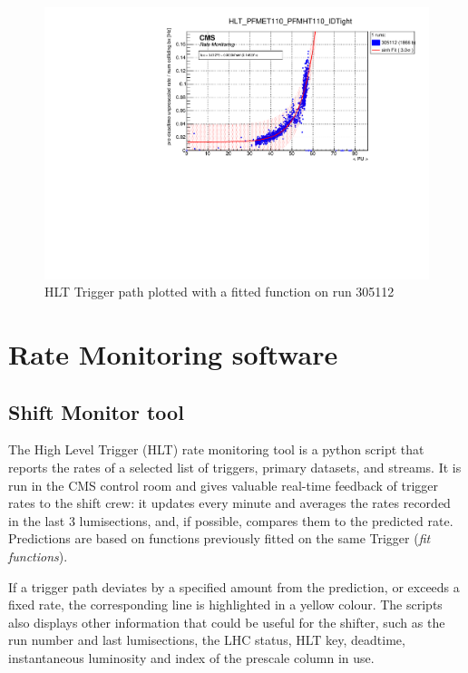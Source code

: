 \begin{figure}
    \centerline{
        \includegraphics[width=0.6\paperwidth]{figures/RMT_305112_HLT_PFMET110_PFMHT110_IDTight.pdf}}
    \caption{HLT Trigger path plotted with a fitted function on run 305112}
    \label{fig:ratemon_hlt}
\end{figure}

\section{Rate Monitoring software}

\subsection{Shift Monitor tool}

The High Level Trigger (HLT) rate monitoring tool is a python script that reports the rates of a selected list of triggers, primary datasets, and streams. It is run in the CMS control room and gives valuable real-time feedback of trigger rates to the shift crew: it updates every minute and averages the rates recorded in the last 3 lumisections, and, if possible, compares them to the predicted rate. Predictions are based on functions previously fitted on the same Trigger (\textit{fit functions}).

If a trigger path deviates by a specified amount from the prediction, or exceeds a fixed rate, the corresponding line is highlighted in a yellow colour. The scripts also displays other information that could be useful for the shifter, such as the run number and last lumisections, the LHC status, HLT key, deadtime, instantaneous luminosity and index of the prescale column in use.

